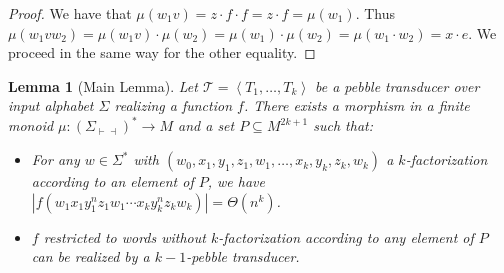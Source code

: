 \documentclass[sigplan,review,anonymous]{acmart}\settopmatter{printfolios=true,printccs=false,printacmref=false}
\newcommand{\atuple}[1]{\left\langle #1 \right\rangle}
\newcommand{\Tt}{\mathcal T}
\newtheorem{lemma}[theorem]{Lemma}
\theoremstyle{definition}
\theoremstyle{remark}
\begin{document}
\begin{proof}
We have that $\mu(w_1v)=z\cdot f\cdot f=z\cdot f=\mu(w_1)$.
Thus $\mu(w_1vw_2)=\mu(w_1v)\cdot \mu(w_2)=\mu(w_1)\cdot \mu(w_2)=\mu(w_1\cdot w_2) =x\cdot e$.
We proceed in the same way for the other equality.
\end{proof}


\begin{lemma}[Main Lemma]\label{lem:name}
    Let $\Tt=\atuple{T_1,\ldots,T_k}$ be a pebble transducer over input alphabet $\Sigma$ realizing a function $f$.
    There exists a morphism in a finite monoid $\mu:(\Sigma_{\vdash\dashv})^*\to M$ and a set $P\subseteq M^{2k+1}$ such that:
    \begin{itemize}
    \item For any $w\in \Sigma^*$ with     $(w_0,x_{1},y_1,z_1,w_1,\ldots,x_k,y_k,z_k, w_k)$ a $k$-factorization according to an element of $P$, we have $|f(w_1x_1y_{1}^nz_1w_1\cdots x_ky_k^nz_kw_k)|=\Theta(n^k)$.
    \item $f$ restricted to words without $k$-factorization according to any element of $P$ can be realized by a $k{-}1$-pebble transducer.
    \end{itemize}
    
\end{lemma}
\end{document}
